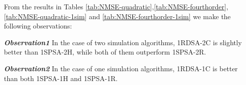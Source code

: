 
From the results in Tables \ref{tab:NMSE-quadratic},\ref{tab:NMSE-fourthorder},
\ref{tab:NMSE-quadratic-1sim} and \ref{tab:NMSE-fourthorder-1sim} 
we make the following observations:

\textit{\textbf{Observation1}} In the case of two simulation algorithms, 
1RDSA-2C is slightly better than 1SPSA-2H, while both of them outperform 1SPSA-2R.

\textit{\textbf{Observation2}} In the case of one simulation algorithms, 
1RDSA-1C is better than both 1SPSA-1H and 1SPSA-1R.

